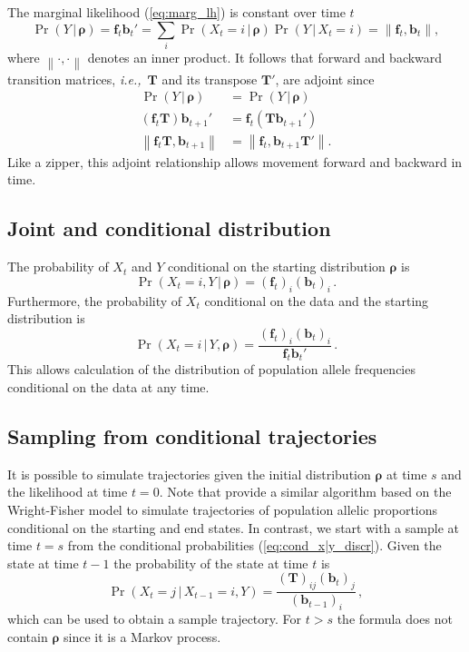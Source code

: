 \documentclass[preprint]{elsarticle}
\newcommand{\bs}[1]{\ensuremath{\boldsymbol{#1}}}
\newcommand\given{{\,|\,}}
\newcommand{\norm}[1]{\left\lVert#1\right\rVert}
\newcommand\ie{{\it i.e.,}}
\newcommand\x[1]{\ensuremath{X_{#1}}}
\newcommand\y{\ensuremath{Y}}
\newcommand\s{\ensuremath{s}}
\newcommand\fv[1]{\ensuremath{\mathbf{f}_{#1}}}
\newcommand\bv[1]{\ensuremath{\mathbf{b}_{#1}}}
\begin{document}
The marginal likelihood (\ref{eq:marg_lh}) is constant over time $t$ 
\begin{equation}
\Pr(\y \given \bs{\rho}) = \fv{t}\bv{t}' =\sum_i \Pr(\x{t}=i \given \bs{\rho}) \Pr(\y \given \x{t}=i) = \norm{ \fv{t}, \bv{t} },
\end{equation}
where $\norm{ \cdot , \cdot }$ denotes an inner product.  It follows that forward and backward transition matrices, \ie\ $\mathbf{T}$ and its transpose $\mathbf{T}'$, are adjoint since
\begin{equation}\label{eq:adjoint_discrete}
\begin{split}
\Pr(\y \given \bs{\rho})              &= \Pr(\y \given \bs{\rho}) \\
(\fv{t}\mathbf{T})\bv{t+1}' &= \fv{t} (\mathbf{T}\bv{t+1}') \\
\norm{ \fv{t}\mathbf{T},\bv{t+1} }  &= \norm{\fv{t},\bv{t+1}\mathbf{T}' }.
\end{split}
\end{equation}
Like a zipper, this adjoint relationship allows movement forward and backward in time.

\subsection{Joint and conditional distribution}

The probability of $\x{t}$ and $\y$ conditional on the starting distribution $\bs{\rho}$ is \begin{equation}\label{eq:joint_xy_discr}
\Pr(\x{t}=i,\y \given \bs{\rho}) = (\fv{t})_i (\bv{t})_i\,.
\end{equation}
Furthermore, the probability of $\x{t}$ conditional on the data and the starting distribution is
\begin{equation}\label{eq:cond_x|y_discr}
\Pr(\x{t}=i \given \y,\bs{\rho}) = \frac{(\fv{t})_i (\bv{t})_i}{\fv{t}\bv{t}'}\,.
\end{equation}
This allows calculation of the distribution of population allele frequencies conditional on the data at any time. 

\subsection{Sampling from conditional trajectories}

It is possible to simulate trajectories given the initial distribution $\bs{\rho}$ at time $\s$ and the likelihood at time $t=0$. Note that \citet{Zhao14} provide a similar algorithm based on the Wright-Fisher model to simulate trajectories of population allelic proportions conditional on the starting and end states. In contrast, we start with a sample at time $t=\s$ from the conditional probabilities (\ref{eq:cond_x|y_discr}). Given the state at time $t-1$ the probability of the state at time $t$ is
\begin{equation}
    \Pr(\x{t}=j\given \x{t-1}=i,\y)=\frac{(\mathbf{T})_{ij}(\mathbf{b}_{t})_j}{(\mathbf{b}_{t-1})_i}\,,
\end{equation}
which can be used to obtain a sample trajectory. For $t>s$ the formula does not contain $\bs{\rho}$ since it is a Markov process.
\end{document}
